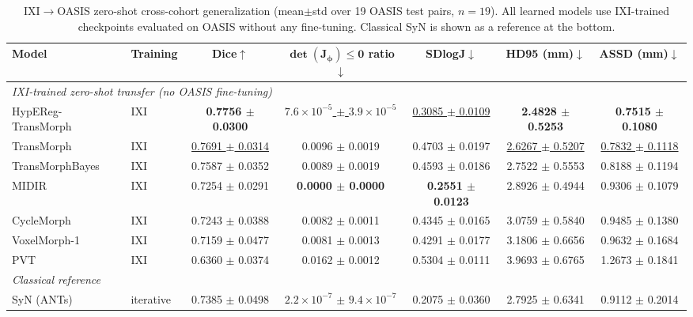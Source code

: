 \documentclass[jimaging,article,submit,pdftex,moreauthors]{Definitions/mdpi}
\newcommand{\best}[1]{\textcolor{BestColor}{\textbf{#1}}}
\newcommand{\snd}[1]{\textcolor{SndColor}{\underline{#1}}}
\begin{document}
\begin{table}[H]
\caption{IXI\(\to\)OASIS zero-shot cross-cohort generalization (mean\(\pm\)std over 19 OASIS test pairs, \(n{=}19\)). All learned models use IXI-trained checkpoints evaluated on OASIS without any fine-tuning. Classical SyN is shown as a reference at the bottom.\label{tab:oasis_zeroshot}}
\centering
\scriptsize
\setlength{\tabcolsep}{3pt}
\begin{tabularx}{\textwidth}{llccccc}
\toprule
\textbf{Model} & \textbf{Training} & \textbf{Dice\(\uparrow\)} & \(\boldsymbol{\det(J_\phi)\le 0}\) \textbf{ratio\(\downarrow\)} & \textbf{SDlogJ\(\downarrow\)} & \textbf{HD95 (mm)\(\downarrow\)} & \textbf{ASSD (mm)\(\downarrow\)}\\
\midrule
\multicolumn{7}{l}{\textit{IXI-trained zero-shot transfer (no OASIS fine-tuning)}}\\
HypEReg-TransMorph & IXI & \best{0.7756 \(\pm\) 0.0300} & \snd{\(7.6\times10^{-5}\) \(\pm\) \(3.9\times10^{-5}\)} & \snd{0.3085 \(\pm\) 0.0109} & \best{2.4828 \(\pm\) 0.5253} & \best{0.7515 \(\pm\) 0.1080} \\
TransMorph & IXI & \snd{0.7691 \(\pm\) 0.0314} & 0.0096 \(\pm\) 0.0019 & 0.4703 \(\pm\) 0.0197 & \snd{2.6267 \(\pm\) 0.5207} & \snd{0.7832 \(\pm\) 0.1118} \\
TransMorphBayes & IXI & 0.7587 \(\pm\) 0.0352 & 0.0089 \(\pm\) 0.0019 & 0.4593 \(\pm\) 0.0186 & 2.7522 \(\pm\) 0.5553 & 0.8188 \(\pm\) 0.1194 \\
MIDIR & IXI & 0.7254 \(\pm\) 0.0291 & \best{0.0000 \(\pm\) 0.0000} & \best{0.2551 \(\pm\) 0.0123} & 2.8926 \(\pm\) 0.4944 & 0.9306 \(\pm\) 0.1079 \\
CycleMorph & IXI & 0.7243 \(\pm\) 0.0388 & 0.0082 \(\pm\) 0.0011 & 0.4345 \(\pm\) 0.0165 & 3.0759 \(\pm\) 0.5840 & 0.9485 \(\pm\) 0.1380 \\
VoxelMorph-1 & IXI & 0.7159 \(\pm\) 0.0477 & 0.0081 \(\pm\) 0.0013 & 0.4291 \(\pm\) 0.0177 & 3.1806 \(\pm\) 0.6656 & 0.9632 \(\pm\) 0.1684 \\
PVT & IXI & 0.6360 \(\pm\) 0.0374 & 0.0162 \(\pm\) 0.0012 & 0.5304 \(\pm\) 0.0111 & 3.9693 \(\pm\) 0.6765 & 1.2673 \(\pm\) 0.1841 \\
\midrule
\multicolumn{7}{l}{\textit{Classical reference}}\\
SyN (ANTs) & iterative & 0.7385 \(\pm\) 0.0498 & \(2.2\times10^{-7}\) \(\pm\) \(9.4\times10^{-7}\) & 0.2075 \(\pm\) 0.0360 & 2.7925 \(\pm\) 0.6341 & 0.9112 \(\pm\) 0.2014 \\
\bottomrule
\end{tabularx}

\end{table}
\end{document}
